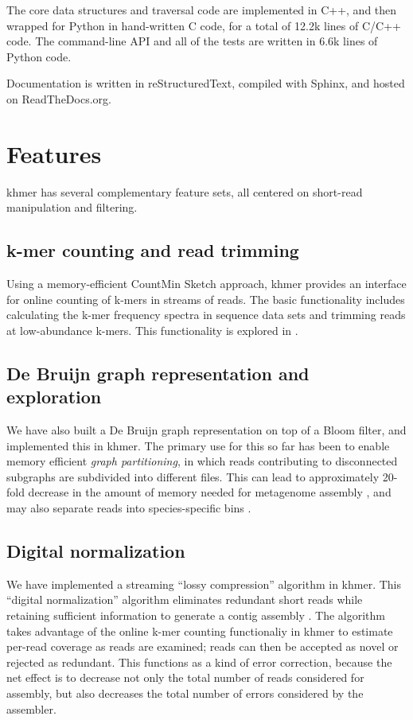 \documentclass[10pt]{article}
\begin{document}
The core data structures and traversal code are implemented in C++, and
then wrapped for Python in hand-written C code, for a total of
12.2k lines of C/C++ code.  The command-line API and all of the tests
are written in 6.6k lines of Python code.

Documentation is written in reStructuredText, compiled with Sphinx, and
hosted on ReadTheDocs.org.

\section*{Features}

khmer has several complementary feature sets, all centered on short-read
manipulation and filtering.

\subsection*{k-mer counting and read trimming}

Using a memory-efficient CountMin Sketch approach, khmer provides an
interface for online counting of k-mers in streams of reads.  The
basic functionality includes calculating the k-mer frequency spectra
in sequence data sets and trimming reads at low-abundance k-mers.
This functionality is explored in \cite{Zhang2013}.

\subsection*{De Bruijn graph representation and exploration}

We have also built a De Bruijn graph representation on top of a Bloom
filter, and implemented this in khmer.  The primary use for this so far
has been to enable memory efficient {\em graph partitioning}, in which
reads contributing to disconnected subgraphs are subdivided into different
files.  This can lead to approximately 20-fold decrease in the amount of
memory needed for metagenome assembly \cite{Pell2012}, and may also separate reads
into species-specific bins \cite{Howe2012}.

\subsection*{Digital normalization}

We have implemented a streaming ``lossy compression'' algorithm in
khmer.  This ``digital normalization'' algorithm eliminates redundant
short reads while retaining sufficient information to generate a
contig assembly \cite{Brown2012}.  The algorithm takes advantage of the online
k-mer counting functionaliy in khmer to estimate per-read coverage as
reads are examined; reads can then be accepted as novel or rejected as
redundant. This functions as a kind of error correction, because the
net effect is to decrease not only the total number of reads considered
for assembly, but also decreases the total number of errors considered
by the assembler.
\end{document}
